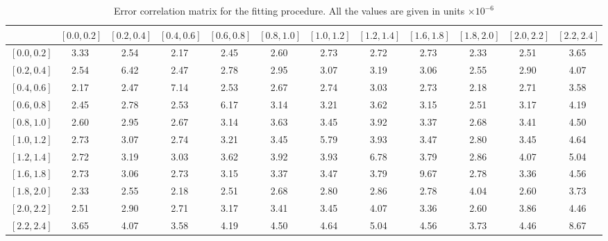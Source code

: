 \begin{table}[tb]
   \begin{center}
      \begin{tabular}{l|ccccccccccc}

& \scriptsize{$\left[0.0,0.2\right]$}
& \scriptsize{$\left[0.2,0.4\right]$}
& \scriptsize{$\left[0.4,0.6\right]$}
& \scriptsize{$\left[0.6,0.8\right]$}
& \scriptsize{$\left[0.8,1.0\right]$}
& \scriptsize{$\left[1.0,1.2\right]$}
& \scriptsize{$\left[1.2,1.4\right]$}
& \scriptsize{$\left[1.6,1.8\right]$}
& \scriptsize{$\left[1.8,2.0\right]$}
& \scriptsize{$\left[2.0,2.2\right]$}
& \scriptsize{$\left[2.2,2.4\right]$} \\ \hline

\scriptsize{$\left[0.0,0.2\right]$}& 3.33& 2.54& 2.17& 2.45& 2.60& 2.73& 2.72& 2.73& 2.33& 2.51& 3.65 \\
\scriptsize{$\left[0.2,0.4\right]$}& 2.54& 6.42& 2.47& 2.78& 2.95& 3.07& 3.19& 3.06& 2.55& 2.90& 4.07 \\
\scriptsize{$\left[0.4,0.6\right]$}& 2.17& 2.47& 7.14& 2.53& 2.67& 2.74& 3.03& 2.73& 2.18& 2.71& 3.58 \\
\scriptsize{$\left[0.6,0.8\right]$}& 2.45& 2.78& 2.53& 6.17& 3.14& 3.21& 3.62& 3.15& 2.51& 3.17& 4.19 \\
\scriptsize{$\left[0.8,1.0\right]$}& 2.60& 2.95& 2.67& 3.14& 3.63& 3.45& 3.92& 3.37& 2.68& 3.41& 4.50 \\
\scriptsize{$\left[1.0,1.2\right]$}& 2.73& 3.07& 2.74& 3.21& 3.45& 5.79& 3.93& 3.47& 2.80& 3.45& 4.64 \\
\scriptsize{$\left[1.2,1.4\right]$}& 2.72& 3.19& 3.03& 3.62& 3.92& 3.93& 6.78& 3.79& 2.86& 4.07& 5.04 \\
\scriptsize{$\left[1.6,1.8\right]$}& 2.73& 3.06& 2.73& 3.15& 3.37& 3.47& 3.79& 9.67& 2.78& 3.36& 4.56 \\
\scriptsize{$\left[1.8,2.0\right]$}& 2.33& 2.55& 2.18& 2.51& 2.68& 2.80& 2.86& 2.78& 4.04& 2.60& 3.73 \\
\scriptsize{$\left[2.0,2.2\right]$}& 2.51& 2.90& 2.71& 3.17& 3.41& 3.45& 4.07& 3.36& 2.60& 3.86& 4.46 \\
\scriptsize{$\left[2.2,2.4\right]$}& 3.65& 4.07& 3.58& 4.19& 4.50& 4.64& 5.04& 4.56& 3.73& 4.46& 8.67 \\

      \end{tabular}
    \end{center}
  \caption{\label{tab_corr_fit}Error correlation matrix for the fitting procedure. All the values are given in units $\times 10^{-6}$ }
\end{table}

